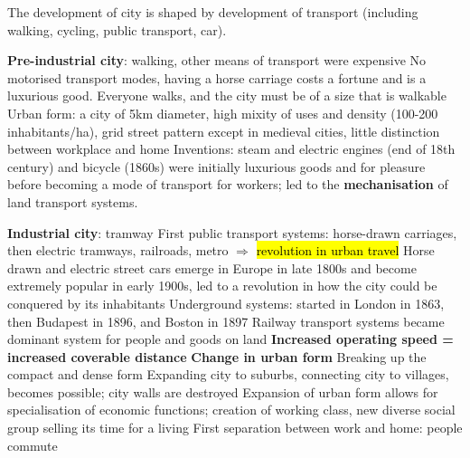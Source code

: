 \documentclass{article}
\begin{document}
The development of city is shaped by development of transport (including walking, cycling, public transport, car).

\begin{outline}
	\1 \textbf{Pre-industrial city}: walking, other means of transport were expensive
		\2 No motorised transport modes, having a horse carriage costs a fortune and is a luxurious good. Everyone walks, and the city must be of a size that is walkable
		\2 Urban form: a city of 5km diameter, high mixity of uses and density (100-200 inhabitants/ha), grid street pattern except in medieval cities, little distinction between workplace and home
		\2 Inventions: steam and electric engines (end of 18th century) and bicycle (1860s) were initially luxurious goods and for pleasure before becoming a mode of transport for workers; led to the \textbf{mechanisation} of land transport systems. 
		
	\1 \textbf{Industrial city}: tramway
		\2 First public transport systems: horse-drawn carriages, then electric tramways, railroads, metro $\Rightarrow$ \hl{revolution in urban travel}
			\3 Horse drawn and electric street cars emerge in Europe in late 1800s and become extremely popular in early 1900s, led to a revolution in how the city could be conquered by its inhabitants
			\3 Underground systems: started in London in 1863, then Budapest in 1896, and Boston in 1897
			\3 Railway transport systems became dominant system for people and goods on land
			\3 \textbf{Increased operating speed = increased coverable distance}
		\2 \textbf{Change in urban form}
			\3 Breaking up the compact and dense form
			\3 Expanding city to suburbs, connecting city to villages, becomes possible; city walls are destroyed
			\3 Expansion of urban form allows for specialisation of economic functions; creation of working class, new diverse social group selling its time for a living
			\3 First separation between work and home: people commute


\end{outline}
\end{document}
